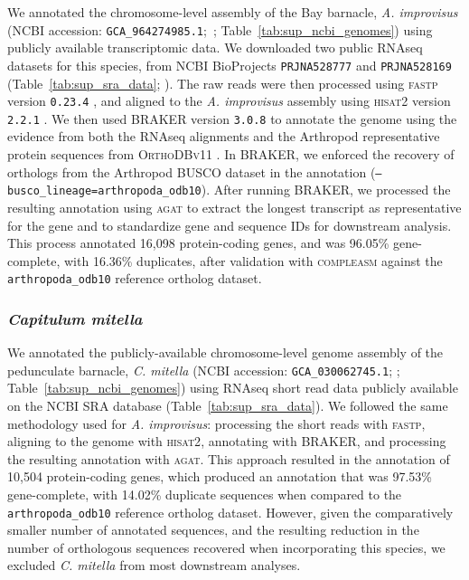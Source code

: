 \documentclass[11pt]{article}
\begin{document}
We annotated the chromosome-level assembly of the Bay barnacle, \textit{A. improvisus}
(NCBI accession: \texttt{GCA\_964274985.1};~\cite{bishop_genome_2025};
Table~\ref{tab:sup_ncbi_genomes}) using publicly available transcriptomic data.
We downloaded two public RNAseq datasets for this species, from NCBI BioProjects
\texttt{PRJNA528777} and \texttt{PRJNA528169} (Table~\ref{tab:sup_sra_data};
\cite{abramova_sensory_2019}).
The raw reads were then processed using \textsc{fastp} version \texttt{0.23.4}
\citep{chen_ultrafast_2023,chen_fastp_2018}, and aligned to the \textit{A. improvisus}
assembly using \textsc{hisat2} version \texttt{2.2.1} \citep{kim_graph-based_2019}.
We then used \textsc{BRAKER} version \texttt{3.0.8} \citep{gabriel_braker3_2024} to
annotate the genome using the evidence from both the RNAseq alignments and the
Arthropod representative protein sequences from \textsc{OrthoDBv11}
\citep{kriventseva_orthodb_2019,zdobnov_orthodb_2021}.
In \textsc{BRAKER}, we enforced the recovery of orthologs from the Arthropod
\textsc{BUSCO} dataset in the annotation (\texttt{--busco\_lineage=arthropoda\_odb10}).
After running \textsc{BRAKER}, we processed the resulting annotation using \textsc{agat}
to extract the longest transcript as representative for the gene and to standardize gene
and sequence IDs for downstream analysis.
This process annotated 16,098 protein-coding genes, and was 96.05\% gene-complete,
with 16.36\% duplicates, after validation with \textsc{compleasm} against the
\texttt{arthropoda\_odb10} reference ortholog dataset.

\subsubsection*{\textit{Capitulum mitella}}

We annotated the publicly-available chromosome-level genome assembly of the pedunculate
barnacle, \textit{C. mitella} (NCBI accession: \texttt{GCA\_030062745.1};
\cite{chen_capmit_2021}; Table~\ref{tab:sup_ncbi_genomes}) using RNAseq short read data
publicly available on the NCBI SRA database (Table~\ref{tab:sup_sra_data}).
We followed the same methodology used for \textit{A. improvisus}: processing the
short reads with \textsc{fastp}, aligning to the genome with \textsc{hisat2}, annotating
with \textsc{BRAKER}, and processing the resulting annotation with \textsc{agat}.
This approach resulted in the annotation of 10,504 protein-coding genes, which
produced an annotation that was 97.53\% gene-complete, with 14.02\% duplicate sequences
when compared to the \texttt{arthropoda\_odb10} reference ortholog dataset.
However, given the comparatively smaller number of annotated sequences, and the
resulting reduction in the number of orthologous sequences recovered when incorporating
this species, we excluded \textit{C. mitella} from most downstream analyses.
\end{document}
